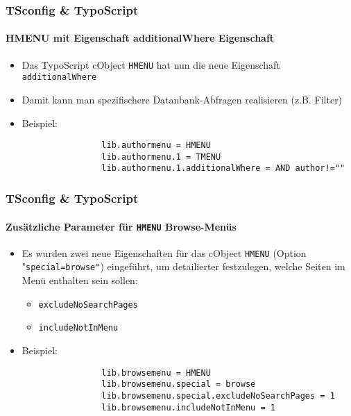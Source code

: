 \begin{frame}[fragile]
	\frametitle{TSconfig \& TypoScript}
	\framesubtitle{HMENU mit Eigenschaft additionalWhere Eigenschaft}

	\begin{itemize}

		\item Das TypoScript cObject \texttt{HMENU} hat nun die neue Eigenschaft \texttt{additionalWhere}
		\item Damit kann man spezifischere Datanbank-Abfragen realisieren (z.B. Filter)

		\item Beispiel:

			\begin{lstlisting}
				lib.authormenu = HMENU
				lib.authormenu.1 = TMENU
				lib.authormenu.1.additionalWhere = AND author!=""
			\end{lstlisting}

	\end{itemize}

\end{frame}


\begin{frame}[fragile]
	\frametitle{TSconfig \& TypoScript}
	\framesubtitle{Zusätzliche Parameter für \texttt{HMENU} Browse-Menüs}

	\begin{itemize}
		\item Es wurden zwei neue Eigenschaften für das cObject \texttt{HMENU} (Option "\texttt{special=browse"})\newline
			eingeführt, um detailierter festzulegen, welche Seiten im Menü enthalten sein sollen:
		
			\begin{itemize}
				\item \texttt{excludeNoSearchPages}
				\item \texttt{includeNotInMenu}
			\end{itemize}

		\item Beispiel:

			\begin{lstlisting}
				lib.browsemenu = HMENU
				lib.browsemenu.special = browse
				lib.browsemenu.special.excludeNoSearchPages = 1
				lib.browsemenu.includeNotInMenu = 1
			\end{lstlisting}

	\end{itemize}

\end{frame}

